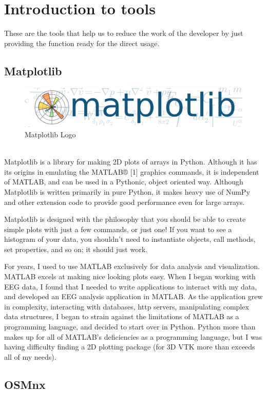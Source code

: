 \section{Introduction to tools}
These are the tools that help us to reduce the work of the developer by just providing the function ready for the direct usage.
\subsection{Matplotlib}
\begin{figure}[h]
	\centering \includegraphics[scale=0.30]{input/images/matplotlib.png}
	\caption{Matplotlib Logo}
\end{figure}\\
Matplotlib is a library for making 2D plots of arrays in Python. Although it has its origins in emulating the MATLAB® [1] graphics commands, it is independent of MATLAB, and can be used in a Pythonic, object oriented way. Although Matplotlib is written primarily in pure Python, it makes heavy use of NumPy and other extension code to provide good performance even for large arrays.

Matplotlib is designed with the philosophy that you should be able to create simple plots with just a few commands, or just one! If you want to see a histogram of your data, you shouldn’t need to instantiate objects, call methods, set properties, and so on; it should just work.

For years, I used to use MATLAB exclusively for data analysis and visualization. MATLAB excels at making nice looking plots easy. When I began working with EEG data, I found that I needed to write applications to interact with my data, and developed an EEG analysis application in MATLAB. As the application grew in complexity, interacting with databases, http servers, manipulating complex data structures, I began to strain against the limitations of MATLAB as a programming language, and decided to start over in Python. Python more than makes up for all of MATLAB’s deficiencies as a programming language, but I was having difficulty finding a 2D plotting package (for 3D VTK more than exceeds all of my needs).

\subsection{OSMnx}

